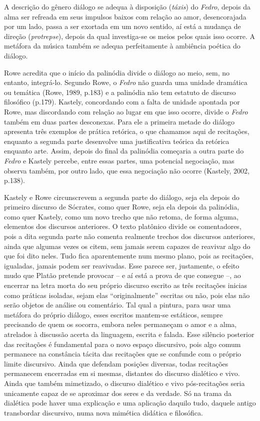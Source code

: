 A descrição do gênero diálogo se adequa à disposição (\emph{táxis}) do
\emph{Fedro}, depois da alma ser refreada em seus impulsos baixos com
relação ao amor, desencorajada por um lado, passa a ser exortada em um
novo sentido, aí está a mudança de direção (\emph{protrepse}), depois da
qual investiga-se os meios pelos quais isso ocorre. A metáfora da música
também se adequa perfeitamente à ambiência poética do diálogo.

Rowe acredita que o início da palinódia divide o diálogo ao meio, sem,
no entanto, integrá-lo. Segundo Rowe, o \emph{Fedro} não guarda uma
unidade dramática ou temática (Rowe, 1989, p.183) e a palinódia não tem
estatuto de discurso filosófico (p.179). Kastely, concordando com a
falta de unidade apontada por Rowe, mas discordando com relação ao lugar
em que isso ocorre, divide o \emph{Fedro} também em duas partes
desconexas. Para ele a primeira metade do diálogo apresenta três
exemplos de prática retórica, o que chamamos aqui de recitações,
enquanto a segunda parte desenvolve uma justificativa teórica da
retórica enquanto arte. Assim, depois do final da palinódia começaria a
outra parte do \emph{Fedro} e Kastely percebe, entre essas partes, uma
potencial negociação, mas observa também, por outro lado, que essa
negociação não ocorre (Kastely, 2002, p.138).

Kastely e Rowe circunscrevem a segunda parte do diálogo, seja ela depois
do primeiro discurso de Sócrates, como quer Rowe, seja ela depois da
palinódia, como quer Kastely, como um novo trecho que não retoma, de
forma alguma, elementos dos discursos anteriores. O texto platônico
divide os comentadores, pois a dita segunda parte não comenta realmente
trechos dos discursos anteriores, ainda que algumas vezes os citem, sem
jamais serem capazes de reavivar algo do que foi dito neles. Tudo fica
aparentemente num mesmo plano, pois as recitações, igualadas, jamais
podem ser reavivadas. Esse parece ser, justamente, o efeito mudo que
Platão pretende provocar -- e aí está a prova de que consegue --, ao
encerrar na letra morta do seu próprio discurso escrito as três
recitações inicias como práticas isoladas, sejam elas ``originalmente''
escritas ou não, pois elas não serão objetos de análise ou comentário.
Tal qual a pintura, para usar uma metáfora do próprio diálogo, esses
escritos mantem-se estáticos, sempre precisando de quem os socorra,
embora neles permaneçam o amor e a alma, atrelados à discussão acerta da
linguagem, escrita e falada. Esse silêncio posterior das recitações é
fundamental para o novo espaço discursivo, pois algo comum permanece na
constância tácita das recitações que se confunde com o próprio limite
discursivo. Ainda que defendam posições diversas, todas recitações
permanecem encerradas em si mesmas, distantes do discurso dialético e
vivo. Ainda que também mimetizado, o discurso dialético e vivo
pós-recitações seria unicamente capaz de se aproximar dos seres e da
verdade. Só na trama da dialética pode haver uma explicação e uma
aplicação daquilo tudo, daquele antigo transbordar discursivo, numa nova
mimética didática e filosófica.

